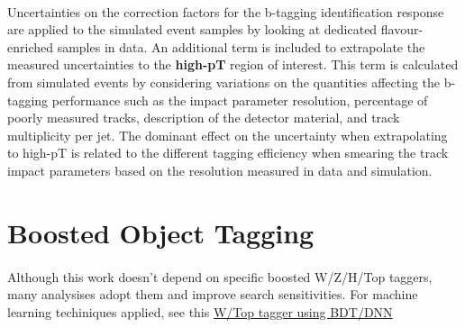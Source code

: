 \paragraph{}
Uncertainties on the correction factors for the b-tagging identification response are applied to the simulated event samples by looking at dedicated flavour-enriched samples in data. An additional term is included to extrapolate the measured uncertainties to the \textbf{high-pT} region of interest. This term is calculated from simulated events by considering variations on the quantities affecting the b-tagging performance such as the impact parameter resolution, percentage of poorly measured tracks, description of the detector material, and track multiplicity per jet. The dominant effect on the uncertainty when extrapolating to high-pT is related to the different tagging efficiency when smearing the track impact parameters based on the resolution measured in data and simulation.


\section{Boosted Object Tagging}
\paragraph{}
Although this work doesn't depend on specific boosted W/Z/H/Top taggers, many analysises adopt them and improve search sensitivities. For machine learning techiniques applied, see this \href{https://cds.cern.ch/record/2242830/files/ATL-COM-PHYS-2017-031.pdf}{W/Top tagger using BDT/DNN}

